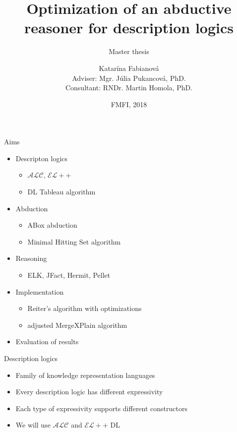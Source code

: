 \documentclass{beamer}
\title{Optimization of an abductive reasoner for description logics}
\subtitle{Master thesis}
\author{Katarína Fabianová \\ Adviser: Mgr. Júlia Pukancová, PhD. \\ Consultant:  RNDr. Martin Homola, PhD.}
\date{FMFI, 2018}
\begin{document}
\begin{frame}
  \titlepage
\end{frame}



\begin{frame}{Aims}
	\begin{itemize}		
		\item {
			Descripton logics
			\begin{itemize}
				\item $\mathcal{ALC}$, $\mathcal{EL{+}{+}}$
				\item DL Tableau algorithm
			\end{itemize}
		}
				
		\item {
			Abduction
			\begin{itemize}
				\item ABox abduction
				\item Minimal Hitting Set algorithm
			\end{itemize}
		}

		\item {
			Reasoning
			\begin{itemize}
				\item ELK, JFact, Hermit, Pellet
			\end{itemize}
		}
												
		\item {
			Implementation
			\begin{itemize}
				\item Reiter's algorithm with optimizations
				\item adjusted MergeXPlain algorithm
			\end{itemize}
		}

		\item {
			Evaluation of results
		}		
	\end{itemize}
\end{frame}


\begin{frame}{Description logics}
  \begin{itemize}
	\item {
		Family of knowledge representation languages
	}
	
	\item {
		Every description logic has different expressivity
	}
	
	\item {
		Each type of expressivity supports different constructors
	}
	
	\item {
		We will use $\mathcal{ALC}$ and $\mathcal{EL{+}{+}}$ DL
	}

  \end{itemize}
\end{frame}
\end{document}
